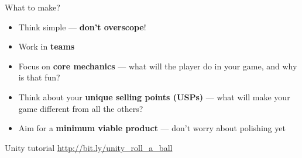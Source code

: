 \begin{frame}{What to make?}
	\begin{itemize}
		\pause\item Think simple --- \textbf{don't overscope}!
		\pause\item Work in \textbf{teams}
		\pause\item Focus on \textbf{core mechanics} --- what will the player do in your game, and why is that fun?
		\pause\item Think about your \textbf{unique selling points (USPs)} --- what will make your game different from all the others?
		\pause\item Aim for a \textbf{minimum viable product} --- don't worry about polishing yet
	\end{itemize}
\end{frame}

\begin{frame}{Unity tutorial}
	\center\url{http://bit.ly/unity_roll_a_ball}
\end{frame}


